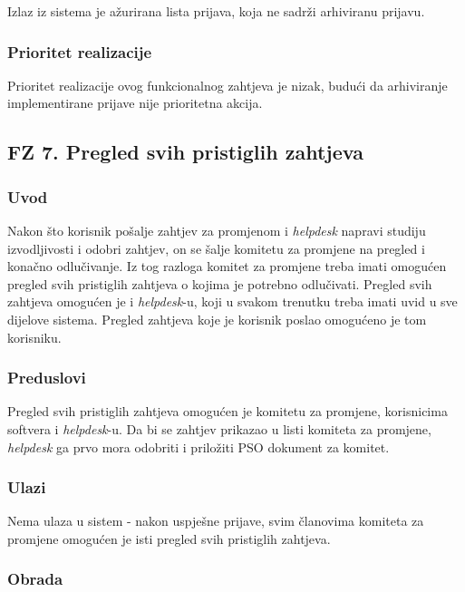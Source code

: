 \documentclass[12pt,a4paper]{article}
\begin{document}
Izlaz iz sistema je ažurirana lista prijava, koja ne sadrži arhiviranu prijavu.

\subsubsection{Prioritet realizacije}

Prioritet realizacije ovog funkcionalnog zahtjeva je nizak, budući da arhiviranje implementirane prijave nije prioritetna akcija.

\subsection{FZ 7. Pregled svih pristiglih zahtjeva}

\subsubsection{Uvod}

Nakon što korisnik pošalje zahtjev za promjenom i \textit{helpdesk} napravi studiju izvodljivosti i odobri zahtjev, on se šalje komitetu za promjene na pregled i konačno odlučivanje. Iz tog razloga komitet za promjene treba imati omogućen pregled svih pristiglih zahtjeva o kojima je potrebno odlučivati. Pregled svih zahtjeva omogućen je i \textit{helpdesk}-u, koji u svakom trenutku treba imati uvid u sve dijelove sistema. Pregled zahtjeva koje je korisnik poslao omogućeno je tom korisniku.

\subsubsection{Preduslovi}

Pregled svih pristiglih zahtjeva omogućen je komitetu za promjene, korisnicima softvera i \textit{helpdesk}-u. Da bi se zahtjev prikazao u listi komiteta za promjene, \textit{helpdesk} ga prvo mora odobriti i priložiti PSO dokument za komitet.

\subsubsection{Ulazi}

Nema ulaza u sistem - nakon uspješne prijave, svim članovima komiteta za promjene omogućen je isti pregled svih pristiglih zahtjeva.

\subsubsection{Obrada}
\end{document}

